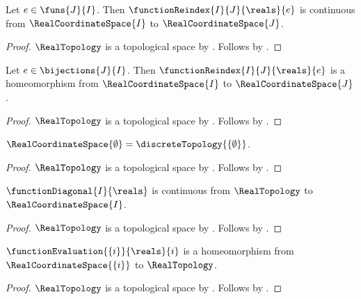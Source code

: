 \begin{theorem}\label{real_coordinate_reindex_continuous}
    Let $e\in\funs{J}{I}$.
    Then $\functionReindex{I}{J}{\reals}{e}$ is continuous from
        $\RealCoordinateSpace{I}$ to $\RealCoordinateSpace{J}$.
\end{theorem}
\begin{proof}
    $\RealTopology$ is a topological space by .
    Follows by .
\end{proof}

\begin{theorem}\label{real_coordinate_reindex_homeomorphism}
    Let $e\in\bijections{J}{I}$.
    Then $\functionReindex{I}{J}{\reals}{e}$ is a homeomorphism from
        $\RealCoordinateSpace{I}$ to $\RealCoordinateSpace{J}$.
\end{theorem}
\begin{proof}
    $\RealTopology$ is a topological space by .
    Follows by .
\end{proof}

\begin{theorem}\label{real_coordinate_space_zero}
    $\RealCoordinateSpace{\emptyset}=\discreteTopology{\{\emptyset\}}$.
\end{theorem}
\begin{proof}
    $\RealTopology$ is a topological space by .
    Follows by .
\end{proof}

\begin{theorem}\label{real_coordinate_diagonal_continuous}
    $\functionDiagonal{I}{\reals}$ is continuous from $\RealTopology$ to
        $\RealCoordinateSpace{I}$.
\end{theorem}
\begin{proof}
    $\RealTopology$ is a topological space by .
    Follows by .
\end{proof}

\begin{theorem}\label{real_single_coordinate_homeomorphism}
    $\functionEvaluation{\{i\}}{\reals}{i}$ is a homeomorphism from
        $\RealCoordinateSpace{\{i\}}$ to $\RealTopology$.
\end{theorem}
\begin{proof}
    $\RealTopology$ is a topological space by .
    Follows by .
\end{proof}

